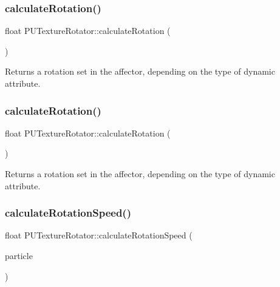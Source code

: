 \subsubsection{\texorpdfstring{calculate\+Rotation()}{calculateRotation()}\hspace{0.1cm}{\footnotesize\ttfamily [1/2]}}
{\footnotesize\ttfamily float P\+U\+Texture\+Rotator\+::calculate\+Rotation (\begin{DoxyParamCaption}\item[{void}]{ }\end{DoxyParamCaption})}

Returns a rotation set in the affector, depending on the type of dynamic attribute. \mbox{\label{classPUTextureRotator_a0996de4263c286d134d4efb7d0c84329}} 
\subsubsection{\texorpdfstring{calculate\+Rotation()}{calculateRotation()}\hspace{0.1cm}{\footnotesize\ttfamily [2/2]}}
{\footnotesize\ttfamily float P\+U\+Texture\+Rotator\+::calculate\+Rotation (\begin{DoxyParamCaption}\item[{void}]{ }\end{DoxyParamCaption})}

Returns a rotation set in the affector, depending on the type of dynamic attribute. \mbox{\label{classPUTextureRotator_a7ffc7eb5ca88b68d6a8fc6d1ce9b8048}} 
\subsubsection{\texorpdfstring{calculate\+Rotation\+Speed()}{calculateRotationSpeed()}\hspace{0.1cm}{\footnotesize\ttfamily [1/2]}}
{\footnotesize\ttfamily float P\+U\+Texture\+Rotator\+::calculate\+Rotation\+Speed (\begin{DoxyParamCaption}\item[{\hyperlink{structPUParticle3D}{P\+U\+Particle3D} $\ast$}]{particle }\end{DoxyParamCaption})}

